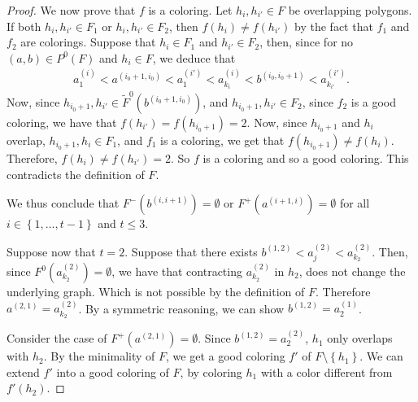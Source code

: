 \documentclass[12pt]{article}
\theoremstyle{definition}
\begin{document}
\begin{proof}
         We now prove that $f$ is a coloring.
         Let $h_{i}, h_{i'} \in F$ be overlapping
         polygons. If both $h_{i}, h_{i'} \in F_1$ 
         or $h_{i}, h_{i'} \in F_2$, then 
         $f\left(h_{i}\right) \neq f\left(h_{i'}\right)$
         by the fact that $f_1$ and $f_2$ 
         are colorings.
         Suppose that $h_{i} \in F_1$ and
         $h_{i'} \in F_2$, then, since for no
         $\left(a, b\right) \in P^{0}\left(F\right)$ 
         and $h_{i} \in F$, we deduce that
         \begin{gather*}
             a_1^{\left(i\right)} < 
             a^{\left(i_0+1, i_0\right)} <
             a_1^{\left(i'\right)} < 
             a_{k_{i}}^{\left(i\right)} < 
             b^{\left(i_0, i_0+1\right)} < 
             a_{k_{i'}}^{\left(i'\right)}.
         \end{gather*}
         Now, since $h_{i_0+1}, h_{i'} \in 
         \widetilde{F}^{0}\left(b^{\left(i_0+1, i_0\right)}\right)$,
         and $h_{i_0+1}, h_{i'} \in F_2$,
         since $f_2$ is a good
         coloring, we have that $f\left(h_{i'}\right) =
         f\left(h_{i_0+1}\right) = 2$.
         Now, since $h_{i_0+1}$ and $h_{i}$ 
         overlap, 
         $h_{i_0+1}, h_{i} \in F_1$,
         and $f_1$ is a coloring, we get
         that $f\left(h_{i_0+1}\right) \neq
         f\left(h_{i}\right)$.
         Therefore, $f\left(h_{i}\right) \neq 
         f\left(h_{i'}\right) = 2$.
         So $f$ is a coloring and so
         a good coloring.
         This contradicts the definition
         of $F$.

         We thus conclude that
         $F^{-}\left(b^{\left(i, i+1\right)}\right) = \emptyset$ 
         or $F^{+}\left(a^{\left(i+1, i\right)}\right) = \emptyset$
         for all
         $i \in \left\{1, \ldots, t-1\right\}$ and
         $t \leq 3$.

         Suppose now that $t = 2$.
         Suppose that there exists
         $b^{\left(1,2\right)} < 
         a_{j}^{\left(2\right)} <
         a_{k_2}^{\left(2\right)}$.
         Then, since $F^{0}\left(a_{k_2}^{\left(2\right)}\right) = 
         \emptyset$, we have that 
         contracting $a_{k_2}^{\left(2\right)}$
         in $h_2$, does not change the underlying 
         graph. Which is not possible by
         the definition of $F$.
         Therefore $a^{\left(2,1\right)} =
         a_{k_2}^{\left(2\right)}$. By a
         symmetric reasoning, we can show
         $b^{\left(1, 2\right)} = a_2^{\left(1\right)}$.
         
         Consider the case of
         $F^{+}\left(a^{\left(2, 1\right)}\right) = \emptyset$.
         Since $b^{\left(1, 2\right)} =
         a_{2}^{\left(2\right)}$, $h_1$ only
         overlaps with $h_2$.
         By the minimality of $F$, 
         we get a good coloring 
         $f'$ of $F \setminus \left\{h_1\right\}$.
         We can extend $f'$ into 
         a good coloring of $F$,
         by coloring $h_1$ with 
         a color different from
         $f'\left(h_2\right)$.


\end{proof}
\end{document}
